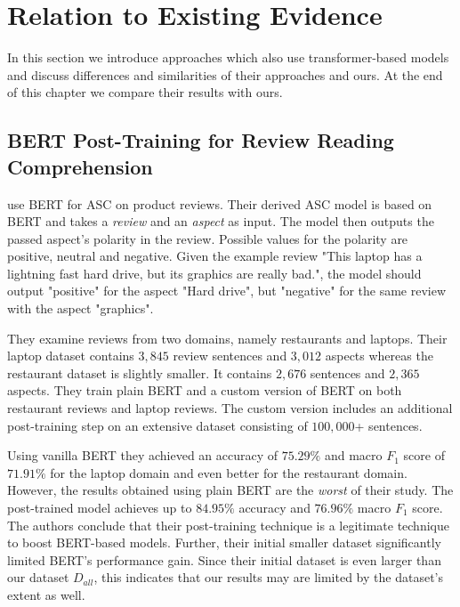 \chapter{Relation to Existing Evidence}
\label{chp:relation_to_existing_evidence}
In this section we introduce approaches which also use transformer-based models and discuss differences and similarities of their approaches and ours.
At the end of this chapter we compare their results with ours.

\section{BERT Post-Training for Review Reading Comprehension}
\Textcite{Xu:2019} use \ac{BERT} for \ac{ASC} on product reviews.
Their derived \ac{ASC} model is based on \ac{BERT} and takes a \textit{review} and an \textit{aspect} as input.
The model then outputs the passed aspect's polarity in the review.
Possible values for the polarity are positive, neutral and negative.
Given the example review "This laptop has a lightning fast hard drive, but its graphics are really bad.", the model should output "positive" for the aspect "Hard drive", but "negative" for the same review with the aspect "graphics".

They examine reviews from two domains, namely restaurants and laptops.
Their laptop dataset contains $3,845$ review sentences and $3,012$ aspects whereas the restaurant dataset is slightly smaller.
It contains $2,676$ sentences and $2,365$ aspects.
They train plain \ac{BERT} and a custom version of \ac{BERT} on both restaurant reviews and laptop reviews.
The custom version includes an additional post-training step on an extensive dataset consisting of $100,000$+ sentences.

Using vanilla \ac{BERT} they achieved an accuracy of $75.29\%$ and macro $F_1$ score of $71.91\%$ for the laptop domain and even better for the restaurant domain.
However, the results obtained using plain \ac{BERT} are the \textit{worst} of their study.
The post-trained model achieves up to $84.95\%$ accuracy and $76.96\%$ macro $F_1$ score.
The authors conclude that their post-training technique is a legitimate technique to boost \ac{BERT}-based models.
Further, their initial smaller dataset significantly limited \ac{BERT}'s performance gain.
Since their initial dataset is even larger than our dataset $D_{all}$, this indicates that our results may are limited by the dataset's extent as well.

